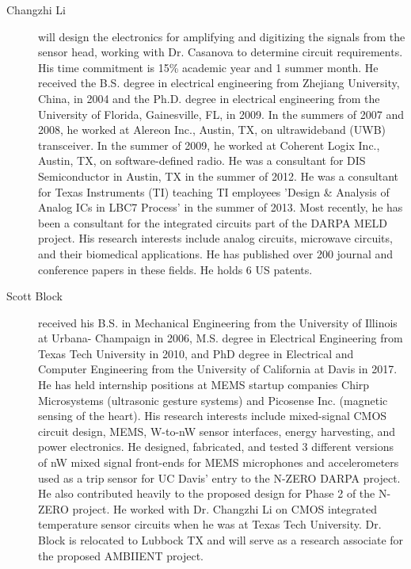 \begin{description}
  \item[Changzhi Li] will design the electronics for amplifying and digitizing the signals from the sensor head, working with Dr. Casanova to determine circuit requirements. His time commitment is 15\% academic year and 1 summer month. He received the B.S. degree in electrical engineering from Zhejiang University, China, in 2004 and the Ph.D. degree in electrical engineering from the University of Florida, Gainesville, FL, in 2009. In the summers of 2007 and 2008, he worked at Alereon Inc., Austin, TX, on ultrawideband (UWB) transceiver. In the summer of 2009, he worked at Coherent Logix Inc., Austin, TX, on software-defined radio. He was a consultant for DIS Semiconductor in Austin, TX in the summer of 2012. He was a consultant for Texas Instruments (TI) teaching TI employees 'Design \& Analysis of Analog ICs in LBC7 Process' in the summer of 2013. Most recently, he has been a consultant for the integrated circuits part of the DARPA MELD project. His research interests include analog circuits, microwave circuits, and their biomedical applications. He has published over 200 journal and conference papers in these fields. He holds 6 US patents.
  \item[Scott Block] received his B.S. in Mechanical Engineering from the University of Illinois at Urbana- Champaign in 2006, M.S. degree in Electrical Engineering from Texas Tech University in 2010, and PhD degree in Electrical and Computer Engineering from the University of California at Davis in 2017. He has held internship positions at MEMS startup companies Chirp Microsystems (ultrasonic gesture systems) and Picosense Inc. (magnetic sensing of the heart). His research interests include mixed-signal CMOS circuit design, MEMS, W-to-nW sensor interfaces, energy harvesting, and power electronics. He designed, fabricated, and tested 3 different versions of nW mixed signal front-ends for MEMS microphones and accelerometers used as a trip sensor for UC Davis' entry to the N-ZERO DARPA project. He also contributed heavily to the proposed design for Phase 2 of the N-ZERO project. He worked with Dr. Changzhi Li on CMOS integrated temperature sensor circuits when he was at Texas Tech University. Dr. Block is relocated to Lubbock TX and will serve as a research associate for the proposed AMBIIENT project.
  
\end{description}
\newpage
{}


